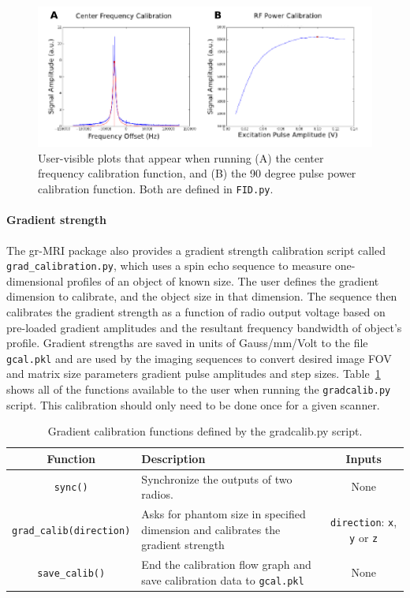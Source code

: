 \documentclass[10pt,letterpaper]{article}
\begin{document}
\begin{figure}[!ht]
\begin{center}
\includegraphics[width = .75\textwidth,trim=0 0 0 0,clip=false]{calibration.png}
\caption{User-visible plots that appear when running (A) the center frequency calibration function, and (B) the 90 degree pulse power calibration function. Both are defined in \texttt{FID.py}.}
\label{fig:calib}
\end{center}
\end{figure}

\paragraph{Gradient strength} 
The gr-MRI package also provides a gradient strength calibration script called \texttt{grad\_calibration.py}, 
which uses a spin echo sequence to measure one-dimensional profiles of an object of known size.  
The user defines the gradient dimension to calibrate, and the object size in that dimension.
The sequence then calibrates the gradient strength as a function of radio output voltage based on pre-loaded gradient amplitudes 
and the resultant frequency bandwidth of object's profile.  
Gradient strengths are saved in units of Gauss/mm/Volt to the file \texttt{gcal.pkl} and are 
used by the imaging sequences to convert desired image FOV 
and matrix size parameters gradient pulse amplitudes and step sizes.
Table~\ref{table:gradcalib_functions} shows all of the functions available to the user when running the \texttt{gradcalib.py} script.
This calibration should only need to be done once for a given scanner. 

\begin{table}
\begin{tabularx}{\textwidth}{| c | X | c |}
	\hline
	\textbf{Function} & \textbf{Description} & \textbf{Inputs}  \\ \hline
	\texttt{sync()} & Synchronize the outputs of two radios. & None\\ \hline
	\texttt{grad\_calib(direction)} & Asks for phantom size in specified dimension and calibrates the gradient strength & \texttt{direction}: \texttt{x}, \texttt{y} or \texttt{z}\\ \hline
	\texttt{save\_calib()} & End the calibration flow graph and save calibration data to \texttt{gcal.pkl} & None\\ \hline	
\end{tabularx}
\caption{Gradient calibration functions defined by the gradcalib.py script.}
\label{table:gradcalib_functions}
\end{table}
\end{document}

